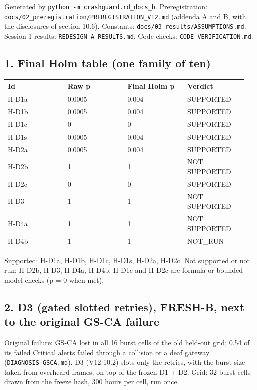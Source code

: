 


Generated by \texttt{python -m crashguard.rd\_docs\_b}. Preregistration: \texttt{docs/02\_preregistration/PREREGISTRATION\_V12.md} (addenda A and B, with the disclosures of section 10.6). Constants: \texttt{docs/03\_results/ASSUMPTIONS.md}. Session 1 results: \texttt{REDESIGN\_A\_RESULTS.md}. Code checks: \texttt{CODE\_VERIFICATION.md}.

\subsection*{1. Final Holm table (one family of ten)}

{\scriptsize\raggedright
\begin{longtable}{p{0.237\linewidth}p{0.237\linewidth}p{0.237\linewidth}p{0.237\linewidth}}
\toprule
Id & Raw p & Final Holm p & Verdict \\
\midrule
\endhead
H-D1a & 0.0005 & 0.004 & SUPPORTED \\
H-D1b & 0.0005 & 0.004 & SUPPORTED \\
H-D1c & 0 & 0 & SUPPORTED \\
H-D1s & 0.0005 & 0.004 & SUPPORTED \\
H-D2a & 0.0005 & 0.004 & SUPPORTED \\
H-D2b & 1 & 1 & NOT SUPPORTED \\
H-D2c & 0 & 0 & SUPPORTED \\
H-D3 & 1 & 1 & NOT SUPPORTED \\
H-D4a & 1 & 1 & NOT SUPPORTED \\
H-D4b & 1 & 1 & NOT\_RUN \\
\bottomrule
\end{longtable}}

Supported: H-D1a, H-D1b, H-D1c, H-D1s, H-D2a, H-D2c. Not supported or not run: H-D2b, H-D3, H-D4a, H-D4b. H-D1c and H-D2c are formula or bounded-model checks (p = 0 when met).

\subsection*{2. D3 (gated slotted retries), FRESH-B, next to the original GS-CA failure}

Original failure: GS-CA lost in all 16 burst cells of the old held-out grid; 0.54 of its failed Critical alerts failed through a collision or a deaf gateway (\texttt{DIAGNOSIS\_GSCA.md}). D3 (V12 10.2) slots only the retries, with the burst size taken from overheard frames, on top of the frozen D1 + D2. Grid: 32 burst cells drawn from the freeze hash, 300 hours per cell, run once.

